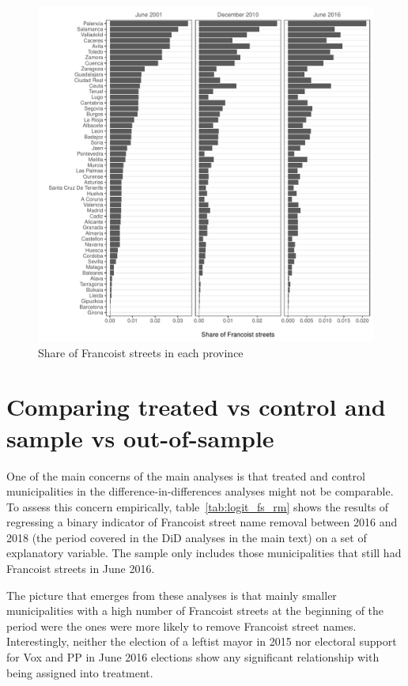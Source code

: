 \documentclass[12pt, titlepage]{article}
\begin{document}
\begin{figure}[htb!]
\centering

  \includegraphics[width = \textwidth]{img/fs_by_prov}

  \caption{Share of Francoist streets in each province}\label{fig:fs_by_prov}

\end{figure}

\clearpage
\section{Comparing treated vs control and sample vs out-of-sample}\label{app:treated_vs_control_vs_outsample}

One of the main concerns of the main analyses is that treated and control municipalities in the difference-in-differences analyses might not be comparable.
To assess this concern empirically, table~\ref{tab:logit_fs_rm} shows the results of regressing a binary indicator of Francoist street name removal between 2016 and 2018 (the period covered in the DiD analyses in the main text) on a set of explanatory variable.
The sample only includes those municipalities that still had Francoist streets in June 2016.



The picture that emerges from these analyses is that mainly smaller municipalities with a high number of Francoist streets at the beginning of the period were the ones were more likely to remove Francoist street names.
Interestingly, neither the election of a leftist mayor in 2015 nor electoral support for Vox and PP in June 2016 elections show any significant relationship with being assigned into treatment.
\end{document}
